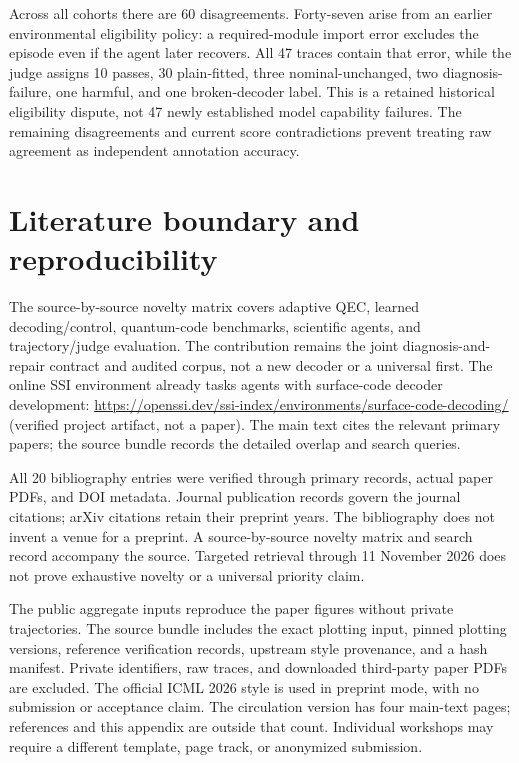 Across all cohorts there are 60 disagreements. Forty-seven arise from an earlier environmental eligibility policy: a required-module import error excludes the episode even if the agent later recovers. All 47 traces contain that error, while the judge assigns 10 passes, 30 plain-fitted, three nominal-unchanged, two diagnosis-failure, one harmful, and one broken-decoder label. This is a retained historical eligibility dispute, not 47 newly established model capability failures. The remaining disagreements and current score contradictions prevent treating raw agreement as independent annotation accuracy.

\section{Literature boundary and reproducibility}
\label{app:artifacts}
The source-by-source novelty matrix covers adaptive QEC, learned decoding/control, quantum-code benchmarks, scientific agents, and trajectory/judge evaluation. The contribution remains the joint diagnosis-and-repair contract and audited corpus, not a new decoder or a universal first. The online SSI environment already tasks agents with surface-code decoder development: \url{https://openssi.dev/ssi-index/environments/surface-code-decoding/} (verified project artifact, not a paper). The main text cites the relevant primary papers; the source bundle records the detailed overlap and search queries.

All 20 bibliography entries were verified through primary records, actual paper PDFs, and DOI metadata. Journal publication records govern the journal citations; arXiv citations retain their preprint years. The bibliography does not invent a venue for a preprint. A source-by-source novelty matrix and search record accompany the source. Targeted retrieval through 11 November 2026 does not prove exhaustive novelty or a universal priority claim.

The public aggregate inputs reproduce the paper figures without private trajectories. The source bundle includes the exact plotting input, pinned plotting versions, reference verification records, upstream style provenance, and a hash manifest. Private identifiers, raw traces, and downloaded third-party paper PDFs are excluded. The official ICML 2026 style is used in preprint mode, with no submission or acceptance claim. The circulation version has four main-text pages; references and this appendix are outside that count. Individual workshops may require a different template, page track, or anonymized submission.
